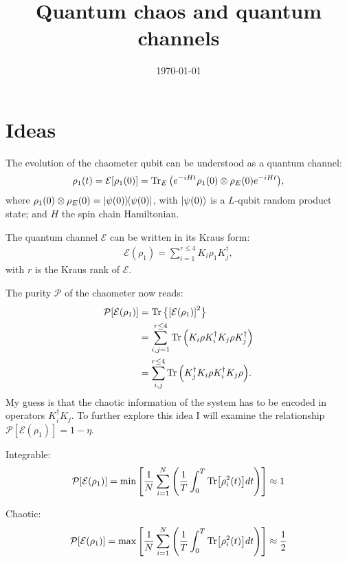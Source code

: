 \documentclass[10pt,letterpaper]{article}
\title{Quantum chaos and quantum channels}
\author{}
\date{\today}
\newcommand{\mcE}{\mathcal E}
\newcommand{\mcP}{\mathcal P}
\begin{document}
\maketitle

\section{Ideas}
The evolution of the chaometer qubit can be understood as a quantum channel:
\begin{align}
\rho_1(t) = 
\mcE[\rho_1(0)] = 
\Tr_E\qty(e^{-iHt} \rho_1(0)\otimes \rho_E(0) e^{-iHt}),
\end{align}
where $\rho_1(0) \otimes \rho_E(0) = \dyad{\psi(0)}$, 
with $\ket{\psi(0)}$ is a $L$-qubit random product state; and $H$ the spin chain 
Hamiltonian.

The quantum channel $\mcE$ can be written in its Kraus form:
\begin{align}
\mcE(\rho_1) = 
\sum_{i=1}^{r\leq 4} K_i \rho_1 K_j^\dagger,
\end{align}
with $r$ is the Kraus rank of $\mcE$.

The purity $\mcP$ of the chaometer now reads:
\begin{align}
\mcP [\mcE(\rho_1)] &=
\Tr \big\{\qty[\mcE(\rho_1)]^2 \big\}\\
&= \sum_{i,j=1}^{r\leq 4}
\Tr \qty( K_i \rho K_i^\dagger K_j \rho K_j^\dagger) \\
&= \sum_{i,j}^{r\leq 4}
\Tr \qty( K_j^\dagger K_i \rho K_i^\dagger K_j \rho).
\end{align}
My guess is that the chaotic information of the system has to be 
encoded in operators $K_i^\dagger K_j$. To further explore this idea 
I will examine the relationship $\mcP [\mcE(\rho_1)]  = 1 - \eta $.

Integrable:
\begin{align}
\mcP [\mcE(\rho_1)] = 
\min \qty[
\frac{1}{N} \sum_{i=1}^N 
\qty(\frac{1}{T}\int_0^T 
\Tr [\rho_i^2(t)] dt
)
] \approx 1
\end{align}

Chaotic:
\begin{align}
\mcP [\mcE(\rho_1)] = 
\max \qty[
\frac{1}{N} \sum_{i=1}^N 
\qty(\frac{1}{T}\int_0^T 
\Tr [\rho_i^2(t)] dt
)
] \approx \frac{1}{2}
\end{align}
\end{document}
